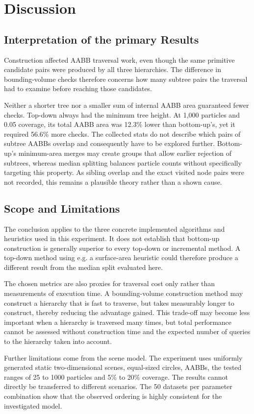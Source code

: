 \chapter{Discussion}

\section{Interpretation of the primary Results}

Construction affected AABB traversal work, even though the same primitive candidate pairs were produced by all three hierarchies.
The difference in bounding-volume checks therefore concerns how many subtree pairs the traversal had to examine before reaching those candidates.

Neither a shorter tree nor a smaller sum of internal AABB area guaranteed fewer checks.
Top-down always had the minimum tree height. 
At 1,000 particles and 0.05 coverage, its total AABB area was 12.3\% lower than bottom-up's, yet it required 56.6\% more checks.
The collected stats do not describe which pairs of subtree AABBs overlap and consequently have to be explored further.
Bottom-up's minimum-area merges may create groups that allow earlier rejection of subtrees, whereas median splitting balances particle counts without specifically targeting this property.
As sibling overlap and the exact visited node pairs were not recorded, this remains a plausible theory rather than a shown cause.


\section{Scope and Limitations}

The conclusion applies to the three concrete implemented algorithms and heuristics used in this experiment.
It does not establish that bottom-up construction is generally superior to every top-down or incremental method.
A top-down method using e.g. a surface-area heuristic could therefore produce a different result from the median split evaluated here.

The chosen metrics are also proxies for traversal cost only rather than measurements of execution time. 
A bounding-volume construction method may construct a hierarchy that is fast to traverse, but takes measurably longer to construct, thereby reducing the advantage gained.
This trade-off may become less important when a hierarchy is traversed many times, but total performance cannot be assessed without construction time and the expected number of queries to the hierarchy taken into account.

Further limitations come from the scene model.
The experiment uses uniformly generated static two-dimensional scenes, equal-sized circles, AABBs, the tested ranges of 25 to 1000 particles and 5\% to 20\% coverage.
The results cannot directly be transferred to different scenarios.
The 50 datasets per parameter combination show that the observed ordering is highly consistent for the investigated model.


\newpage
